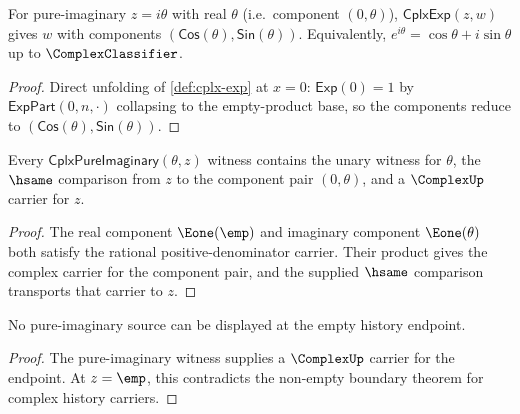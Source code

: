 \begin{theorem}
\label{thm:cplx-exp-euler}
For pure-imaginary \(z = i\theta\) with real \(\theta\) (i.e.\ component \((0, \theta)\)), \(\mathsf{CplxExp}(z, w)\) gives \(w\) with components \((\mathsf{Cos}(\theta), \mathsf{Sin}(\theta))\). Equivalently, \(e^{i\theta} = \cos\theta + i\sin\theta\) up to \(\ComplexClassifier\).
\end{theorem}
\begin{proof}
Direct unfolding of \autoref{def:cplx-exp} at \(x = 0\): \(\mathsf{Exp}(0) = 1\) by \(\mathsf{ExpPart}(0, n, \cdot)\) collapsing to the empty-product base, so the components reduce to \((\mathsf{Cos}(\theta), \mathsf{Sin}(\theta))\).
\end{proof}

\begin{theorem}
\label{thm:cplx-pure-imaginary-complex-carrier}
Every \(\mathsf{CplxPureImaginary}(\theta,z)\) witness contains the unary witness for \(\theta\), the \(\hsame\) comparison from \(z\) to the component pair \((0,\theta)\), and a \(\ComplexUp\) carrier for \(z\).
\end{theorem}
\begin{proof}
The real component \(\Eone(\emp)\) and imaginary component \(\Eone(\theta)\) both satisfy the rational positive-denominator carrier. Their product gives the complex carrier for the component pair, and the supplied \(\hsame\) comparison transports that carrier to \(z\).
\end{proof}

\begin{theorem}
\label{thm:cplx-pure-imaginary-empty-absurd}
No pure-imaginary source can be displayed at the empty history endpoint.
\end{theorem}
\begin{proof}
The pure-imaginary witness supplies a \(\ComplexUp\) carrier for the endpoint.
At \(z=\emp\), this contradicts the non-empty boundary theorem for complex
history carriers.
\end{proof}

